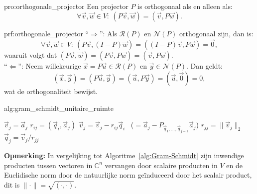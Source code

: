 \begin{pro}{pro:orthogonale_projector}
    Een projector $P$ is orthogonaal als en alleen als:
    \begin{equation*}
        \forall \vec{v},\vec{w} \in V: \ (P\vec{v},\vec{w}) = (\vec{v},P\vec{w}).
    \end{equation*}
    \vspace{-0.5cm}
\end{pro}

\begin{prf}{prf:orthogonale_projector}
    ``$\Rightarrow$'': Als $\mathcal{R}(P)$ en $\mathcal{N}(P)$ orthogonaal zijn, dan is:
    \begin{equation*}
        \forall \vec{v},\vec{w} \in V: \ (P\vec{v},(I-P)\vec{w}) = ((I-P)\vec{v},P\vec{w}) = \vec{0},
    \end{equation*}
    waaruit volgt dat $(P\vec{v},\vec{w}) = (P\vec{v}, P\vec{w}) = (\vec{v},P\vec{w})$. \\
    
    ``$\Leftarrow$'': Neem willekeurige $\vec{x} = P\vec{u} \in \mathcal{R}(P)$ en $\vec{y} \in \mathcal{N}(P)$. Dan geldt:
    \begin{equation*}
        (\vec{x},\vec{y}) = (P\vec{u},\vec{y}) = (\vec{u},P\vec{y}) = (\vec{u},\vec{0}) = 0,
    \end{equation*}
    wat de orthogonaliteit bewijst.
\end{prf}

\newpage

\begin{alg}{alg:gram_schmidt_unitaire_ruimte}
    \begin{tcolorbox}[colback=white, colframe=gray, arc=0mm] 
        \begin{algorithmic}[1]
            \State $\vec{v}_j = \vec{a}_j$
                \State $r_{ij} = (\vec{q}_i,\vec{a}_j)$
                \State $\vec{v}_j = \vec{v}_j - r_{ij} \vec{q}_i$  \ ($= \vec{a}_j - P_{\vec{q}_1, \ldots, \vec{q}_{j-1}}\vec{a}_j$)
            \EndFor
            \State $r_{jj} = \|\vec{v}_j\|_2$
            \State $\vec{q}_j = \vec{v}_j / r_{jj}$
        \EndFor
        \end{algorithmic}
    \end{tcolorbox}
    \vspace{0.3cm}
    \textbf{Opmerking:} In vergelijking tot Algoritme~\ref{alg:Gram-Schmidt} zijn inwendige producten tussen vectoren in $\mathbb{C}^n$ vervangen door scalaire producten in $V$ en de Euclidische norm door de natuurlijke norm geïnduceerd door het scalair product, dit is $\|\cdot\| = \sqrt{(\cdot,\cdot)}$.
\end{alg}